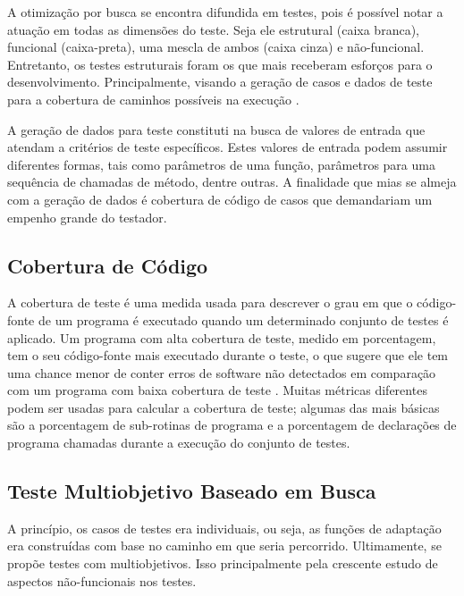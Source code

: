 A otimização por busca se encontra difundida em testes, pois é possível notar a atuação em todas as dimensões do teste. Seja ele estrutural (caixa branca), funcional (caixa-preta), uma mescla de ambos (caixa cinza) e não-funcional. Entretanto, os testes estruturais foram os que mais receberam esforços para o desenvolvimento. Principalmente, visando a geração de casos e dados de teste para a cobertura de caminhos possíveis na execução \cite{khari2017extensive}. 

A geração de dados para teste constituti na busca de valores de entrada que atendam a critérios de teste específicos. Estes valores de entrada podem assumir diferentes formas, tais como parâmetros de uma função, parâmetros para uma sequência de chamadas de método, dentre outras. A finalidade que mias se almeja com a geração de dados é cobertura de código de casos que demandariam um empenho grande do testador.

\subsection{Cobertura de Código}

A cobertura de teste é uma medida usada para descrever o grau em que o código-fonte de um programa é executado quando um determinado conjunto de testes é aplicado. Um programa com alta cobertura de teste, medido em porcentagem, tem o seu código-fonte mais executado durante o teste, o que sugere que ele tem uma chance menor de conter erros de software não detectados em comparação com um programa com baixa cobertura de teste \cite{yang2009survey}. Muitas métricas diferentes podem ser usadas para calcular a cobertura de teste; algumas das mais básicas são a porcentagem de sub-rotinas de programa e a porcentagem de declarações de programa chamadas durante a execução do conjunto de testes.

\subsection{Teste Multiobjetivo Baseado em Busca}

A princípio, os casos de testes era individuais, ou seja, as funções de adaptação era construídas com base no caminho em que seria percorrido. Ultimamente, se propõe testes com multiobjetivos. Isso principalmente pela crescente estudo de aspectos não-funcionais nos testes.









